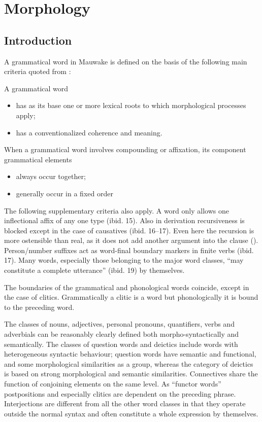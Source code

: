 
\chapter{Morphology}
{}
\section{Introduction}
{}
A grammatical word in Mauwake is defined on the basis of the following main criteria quoted from \citet[12--14]{Dixon2010b}:

A grammatical word
\begin{itemize}
\item has as its base one or more lexical roots to which morphological processes apply;
\item has a conventionalized coherence and meaning.
\end{itemize}
When a grammatical word involves compounding or affixation, its component grammatical elements 

\begin{itemize}
\item always occur together;
\item generally occur in a fixed order
\end{itemize}

The following supplementary criteria also apply. A word only allows one inflectional affix of any one type (ibid. 15). Also in derivation recursiveness is blocked except in the case of causatives (ibid. 16--17). Even here the recursion is more ostensible than real, as it does not add another argument into the clause (). Person/number suffixes act as word-final boundary markers in finite verbs (ibid. 17). Many words, especially those belonging to the major word classes, ``may constitute a complete utterance'' (ibid. 19) by themselves. 

The boundaries of the grammatical and phonological words coincide, except in the case of clitics. Grammatically a clitic is a word but phonologically it is bound to the preceding word.

The classes of nouns, adjectives, personal pronouns, quantifiers, verbs and adverbials can be reasonably clearly defined both morpho-syntactically and semantically. The classes of question words and deictics include words with heterogeneous syntactic behaviour; question words have semantic and functional, and some morphological similarities as a group, whereas the category of deictics is based on strong morphological and semantic similarities. Connectives share the function of conjoining elements on the same level. As ``functor words'' postpositions and especially clitics are dependent on the preceding phrase. Interjections are different from all the other word classes in that they operate outside the normal syntax and often constitute a whole expression by themselves.

